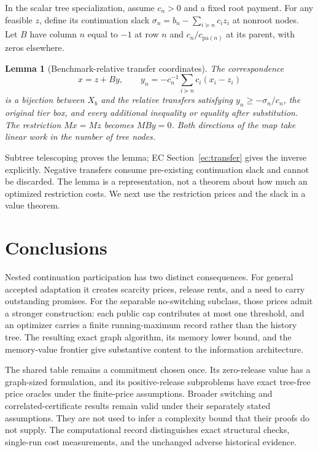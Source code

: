 \documentclass[11pt,letterpaper]{article}
\newtheorem{lemma}[theorem]{Lemma}
\theoremstyle{definition}\newtheorem{assumption}[theorem]{Assumption}
\begin{document}
In the scalar tree specialization, assume $c_n>0$ and a fixed root payment. For any feasible $z$, define its continuation slack $\sigma_n=b_n-\sum_{i\succeq n}c_i z_i$ at nonroot nodes. Let $B$ have column $n$ equal to $-1$ at row $n$ and $c_n/c_{\mathrm{pa}(n)}$ at its parent, with zeros elsewhere.
\begin{lemma}[Benchmark-relative transfer coordinates]\label{lem:transfers}
The correspondence
\begin{equation}\label{eq:transfers}
 x=z+By,\qquad y_n=-c_n^{-1}\sum_{i\succeq n}c_i(x_i-z_i)
\end{equation}
is a bijection between $X_b$ and the relative transfers satisfying
$y_n\geq-\sigma_n/c_n$, the original tier box, and every additional inequality or equality after substitution. The restriction $Mx=Mz$ becomes $MBy=0$. Both directions of the map take linear work in the number of tree nodes.
\end{lemma}
Subtree telescoping proves the lemma; EC Section~\ref{ec:transfer} gives the inverse explicitly. Negative transfers consume pre-existing continuation slack and cannot be discarded. The lemma is a representation, not a theorem about how much an optimized restriction costs. We next use the restriction prices and the slack in a value theorem.





\section{Conclusions}
Nested continuation participation has two distinct consequences. For general accepted adaptation it creates scarcity prices, release rents, and a need to carry outstanding promises. For the separable no-switching subclass, those prices admit a stronger construction: each public cap contributes at most one threshold, and an optimizer carries a finite running-maximum record rather than the history tree. The resulting exact graph algorithm, its memory lower bound, and the memory-value frontier give substantive content to the information architecture.

The shared table remains a commitment chosen once. Its zero-release value has a graph-sized formulation, and its positive-release subproblems have exact tree-free price oracles under the finite-price assumptions. Broader switching and correlated-certificate results remain valid under their separately stated assumptions. They are not used to infer a complexity bound that their proofs do not supply. The computational record distinguishes exact structural checks, single-run cost measurements, and the unchanged adverse historical evidence.
\end{document}
